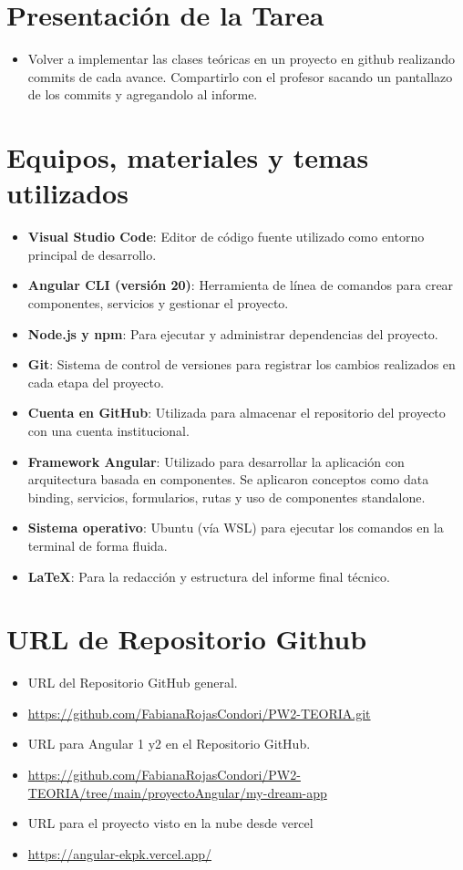 \documentclass{article}
\begin{document}
	\section{Presentación de la Tarea}
	\begin{itemize}		
		\item Volver a implementar las clases teóricas en un proyecto en github realizando commits de cada avance.  Compartirlo con el profesor sacando un pantallazo de los commits y agregandolo al informe.
		
		
	\end{itemize}
	
	\section{Equipos, materiales y temas utilizados }
	\begin{itemize}
		\item \textbf{Visual Studio Code}: Editor de código fuente utilizado como entorno principal de desarrollo.
  \item \textbf{Angular CLI (versión 20)}: Herramienta de línea de comandos para crear componentes, servicios y gestionar el proyecto.
  \item \textbf{Node.js y npm}: Para ejecutar y administrar dependencias del proyecto.
  \item \textbf{Git}: Sistema de control de versiones para registrar los cambios realizados en cada etapa del proyecto.
  \item \textbf{Cuenta en GitHub}: Utilizada para almacenar el repositorio del proyecto con una cuenta institucional.
  \item \textbf{Framework Angular}: Utilizado para desarrollar la aplicación con arquitectura basada en componentes. Se aplicaron conceptos como data binding, servicios, formularios, rutas y uso de componentes standalone.
  \item \textbf{Sistema operativo}: Ubuntu (vía WSL) para ejecutar los comandos en la terminal de forma fluida.
  \item \textbf{LaTeX}: Para la redacción y estructura del informe final técnico.
		
	\end{itemize}
	
	\section{URL de Repositorio Github}
	\begin{itemize}
		\item URL del Repositorio GitHub general.
		\item \url{https://github.com/FabianaRojasCondori/PW2-TEORIA.git}
        
		\item URL para Angular 1 y2  en el Repositorio GitHub.
		\item \url{https://github.com/FabianaRojasCondori/PW2-TEORIA/tree/main/proyectoAngular/my-dream-app}
        \item URL para el proyecto visto en la nube desde vercel
		\item \url{https://angular-ekpk.vercel.app/}
	\end{itemize}	
\end{document}
